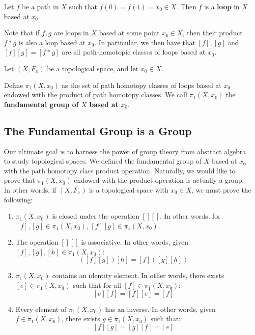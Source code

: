 \begin{definition}
Let $f$ be a path in $X$ such that $f(0) = f(1) = x_0\in X$. Then $f$ is a \textbf{loop} in $X$ based at $x_0$. 
\end{definition}

Note that if $f,g$ are loops in $X$ based at some point $x_0\in X$, then their product $f*g$ is also a loop based at $x_0$. In particular, we then have that $[f],[g]$ and $[f][g] = [f*g]$ are all path-homotopic classes of loops based at $x_0$. 

\begin{definition}
Let $(X,F_x)$ be a topological space, and let $x_0\in X$. 

Define $\pi_1(X,x_0)$ as the set of path homotopy classes of loops based at $x_0$ endowed with the product of path homotopy classes. We call $\pi_1(X,x_0)$ the \textbf{fundamental group of $X$ based at $x_0$}.
\end{definition}

\subsection{The Fundamental Group is a Group}

Our ultimate goal is to harness the power of group theory from abstract algebra to study topological spaces. 
We defined the fundamental group of $X$ based at $x_0$ with the path homotopy class product operation. 
Naturally, we would like to prove that $\pi_1(X,x_0)$ endowed with the product operation is actually a group. In other words, if $(X,F_x)$ is a topological space with $x_0\in X$, we must prove the following:
\begin{enumerate}
\item $\pi_1(X,x_0)$ is closed under the operation $[][]$. In other words, for $[f],[g]\in \pi_1(X,x_0)$, $[f][g] \in \pi_1(X,x_0)$.
\item The operation $[][]$ is associative. In other words, given $[f],[g],[h]\in \pi_1(X,x_0)$:
\[ ([f][g])[h] = [f]([g][h])\]
\item $\pi_1(X,x_0)$ contains an identity element. In other words, there exists $[e]\in \pi_1(X,x_0)$ such that for all $[f]\in\pi_1(X,x_0)$:
\[[e][f] = [f][e] = [f]\]
\item Every element of $\pi_1(X,x_0)$ has an inverse. In other words, given $f\in \pi_1(X,x_0)$, there exists $g\in \pi_1(X,x_0)$ such that:
\[[f][g] = [g][f] = [e]\]
\end{enumerate}

